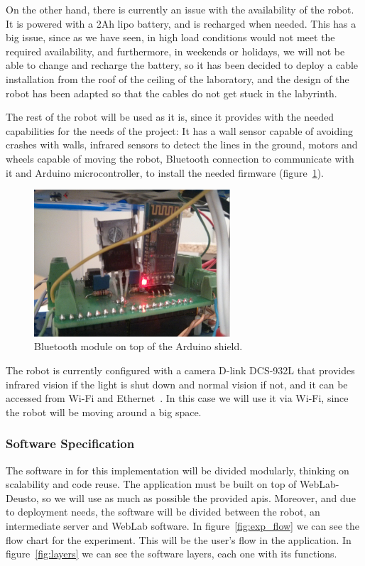 On the other hand, there is currently an issue with the availability of the robot. It is powered
with a 2Ah \acrshort{lipo} battery, and is recharged when needed. This has a big issue, since as we
have seen, in high load conditions would not meet the required availability, and furthermore, in
weekends or holidays, we will not be able to change and recharge the battery, so it has been decided
to deploy a cable installation from the roof of the ceiling of the laboratory, and the design of the
robot has been adapted so that the cables do not get stuck in the labyrinth.

The rest of the robot will be used as it is, since it provides with the needed capabilities for the
needs of the project: It has a wall sensor capable of avoiding crashes with walls, infrared sensors
to detect the lines in the ground, motors and wheels capable of moving the robot, Bluetooth
connection to communicate with it and Arduino microcontroller, to install the needed firmware
(figure~\ref{fig:bluetooth}).

\begin{figure}[!htbp]
	\centering
	\includegraphics[width=0.65\textwidth]{fig/bluetooth}
	\caption{Bluetooth module on top of the Arduino shield.}
	\label{fig:bluetooth}
\end{figure}

The robot is currently configured with a camera D-link DCS-932L that provides infrared vision if the
light is shut down and normal vision if not, and it can be accessed from Wi-Fi and
Ethernet~\cite{camera}. In this case we will use it via Wi-Fi, since the robot will be moving around
a big space.

\subsubsection{Software Specification}

The software in for this implementation will be divided modularly, thinking on scalability and
code reuse. The application must be built on top of WebLab-Deusto, so we will use as much as
possible the provided \acrshort{api}s. Moreover, and due to deployment needs, the software will be
divided between the robot, an intermediate server and WebLab software. In figure~\ref{fig:exp_flow}
we can see the flow chart for the experiment. This will be the user's flow in the application. In
figure~\ref{fig:layers} we can see the software layers, each one with its functions.


